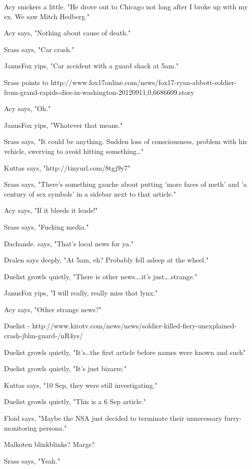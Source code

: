 Acy snickers a little. "He drove out to Chicago not long after I broke up with my ex.  We saw Mitch Hedberg."

Acy says, "Nothing about cause of death."

Srass says, "Car crash."

JanusFox yips, "Car accident with a guard shack at 5am."

Srass points to http://www.fox17online.com/news/fox17-ryan-abbott-soldier-from-grand-rapids-dies-in-washington-20120911,0,6686609.story

Acy says, "Oh."

JanusFox yips, "Whatever that means."

Srass says, "It could be anything.  Sudden loss of consciousness, problem with his vehicle, swerving to avoid hitting something\ldots{}"

Kuttas says, "http://tinyurl.com/8tgj9y7"

Srass says, "There's something gauche about putting 'more faces of meth' and 'a century of sex symbols' in a sidebar next to that article."

Acy says, "If it bleeds it leads!"

Srass says, "Fucking media."

Dachande. says, "That's local news for ya."

Dralen says deeply, "At 5am, eh? Probably fell asleep at the wheel."

Duelist growls quietly, "There is other news\ldots{}.it's just\ldots{}.strange."

JanusFox yips, "I will really, really miss that lynx."

Acy says, "Other strange news?"

Duelist - http://www.kirotv.com/news/news/soldier-killed-fiery-unexplained-crash-jblm-guard-/nR4ys/

Duelist growls quietly, "It's\ldots{}the first article before names were known and such"

Duelist growls quietly, "It's just bizarre."

Kuttas says, "10 Sep, they were still investigating."

Duelist growls quietly, "This is a 6 Sep article."

Floid says, "Maybe the NSA just decided to terminate their unnecessary furry-monitoring persona."

Malkoten blinkblinks?  Margs?

Srass says, "Yeah."

